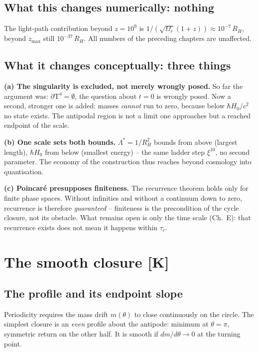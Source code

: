 \documentclass[11pt]{report}
\begin{document}
\section{What this changes numerically: nothing}

The light-path contribution beyond $z = 10^9$ is
$1/(\sqrt{\Omega_r}(1{+}z)) \approx 10^{-7}\,R_H$, beyond
$z_\text{max}$ still $10^{-37}\,R_H$. All numbers of the
preceding chapters are unaffected.

\section{What it changes conceptually: three things}

\textbf{(a) The singularity is excluded, not merely wrongly
posed.} So far the argument was: $\partial\text{T}^4 =
\emptyset$, the question about $t=0$ is wrongly posed. Now a
second, stronger one is added: masses \emph{cannot} run to zero,
because below $\hbar H_0/c^2$ no state exists. The antipodal
region is not a limit one approaches but a reached endpoint of the
scale.

\textbf{(b) One scale sets both bounds.} $\Lambda^{*} = 1/R_H^2$
bounds from above (largest length), $\hbar H_0$ from below
(smallest energy) -- the same ladder step $\xi^{10}$, no second
parameter. The economy of the construction thus reaches beyond
cosmology into quantisation.

\textbf{(c) Poincaré presupposes finiteness.} The recurrence
theorem holds only for finite phase spaces. Without infinities and
without a continuum down to zero, recurrence is therefore
\emph{guaranteed} -- finiteness is the precondition of the cycle
closure, not its obstacle. What remains open is only the time
scale (Ch.~E): that recurrence exists does not mean it happens
within $\tau_c$.

\chapter{The smooth closure [K]}

\section{The profile and its endpoint slope}

Periodicity requires the mass drift $m(\theta)$ to close
continuously on the circle. The simplest closure is an \emph{even}
profile about the antipode: minimum at $\theta=\pi$, symmetric
return on the other half. It is smooth if $dm/d\theta \to 0$ at
the turning point.
\end{document}
